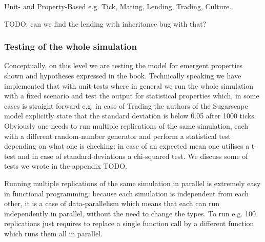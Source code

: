 Unit- and Property-Based e.g. Tick, Mating, Lending, Trading, Culture.

TODO: can we find the lending with inheritance bug with that?

\subsubsection{Testing of the whole simulation}
Conceptually, on this level we are testing the model for emergent properties shown and hypotheses expressed in the book. Technically speaking we have implemented that with unit-tests where in general we run the whole simulation with a fixed scenario and test the output for statistical properties which, in some cases is straight forward e.g. in case of Trading the authors of the Sugarscape model explicitly state that the standard deviation is below 0.05 after 1000 ticks.
Obviously one needs to run multiple replications of the same simulation, each with a different random-number generator and perform a statistical test depending on what one is checking: in case of an expected mean one utilises a t-test and in case of standard-deviations a chi-squared test. We discuss some of tests we wrote in the appendix TODO. 

Running multiple replications of the same simulation in parallel is extremely easy in functional programming: because each simulation is independent from each other, it is a case of data-parallelism which means that each can run independently in parallel, without the need to change the types. To run e.g. 100 replications just requires to replace a single function call by a different function which runs them all in parallel.
